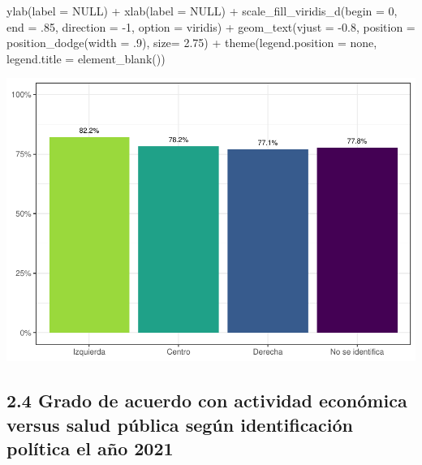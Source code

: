 \documentclass[
  12pt,
]{book}
\newenvironment{Shaded}{\begin{snugshade}}{\end{snugshade}}
\newcommand{\AttributeTok}[1]{\textcolor[rgb]{0.77,0.63,0.00}{#1}}
\newcommand{\ConstantTok}[1]{\textcolor[rgb]{0.00,0.00,0.00}{#1}}
\newcommand{\DecValTok}[1]{\textcolor[rgb]{0.00,0.00,0.81}{#1}}
\newcommand{\FloatTok}[1]{\textcolor[rgb]{0.00,0.00,0.81}{#1}}
\newcommand{\FunctionTok}[1]{\textcolor[rgb]{0.00,0.00,0.00}{#1}}
\newcommand{\NormalTok}[1]{#1}
\newcommand{\SpecialCharTok}[1]{\textcolor[rgb]{0.00,0.00,0.00}{#1}}
\newcommand{\StringTok}[1]{\textcolor[rgb]{0.31,0.60,0.02}{#1}}
\begin{document}
\begin{Shaded}
\begin{Highlighting}[]
    \FunctionTok{ylab}\NormalTok{(}\AttributeTok{label =} \ConstantTok{NULL}\NormalTok{) }\SpecialCharTok{+}
    \FunctionTok{xlab}\NormalTok{(}\AttributeTok{label =} \ConstantTok{NULL}\NormalTok{) }\SpecialCharTok{+}
    \FunctionTok{scale\_fill\_viridis\_d}\NormalTok{(}\AttributeTok{begin =} \DecValTok{0}\NormalTok{, }\AttributeTok{end =}\NormalTok{ .}\DecValTok{85}\NormalTok{, }\AttributeTok{direction =} \SpecialCharTok{{-}}\DecValTok{1}\NormalTok{, }\AttributeTok{option =} \StringTok{\textquotesingle{}viridis\textquotesingle{}}\NormalTok{) }\SpecialCharTok{+}
    \FunctionTok{geom\_text}\NormalTok{(}\AttributeTok{vjust =} \SpecialCharTok{{-}}\FloatTok{0.8}\NormalTok{,}
              \AttributeTok{position =} \FunctionTok{position\_dodge}\NormalTok{(}\AttributeTok{width =}\NormalTok{ .}\DecValTok{9}\NormalTok{),}
              \AttributeTok{size=} \FloatTok{2.75}\NormalTok{) }\SpecialCharTok{+}
    \FunctionTok{theme}\NormalTok{(}\AttributeTok{legend.position =} \StringTok{\textquotesingle{}none\textquotesingle{}}\NormalTok{,   }
          \AttributeTok{legend.title =} \FunctionTok{element\_blank}\NormalTok{())}
\end{Highlighting}
\end{Shaded}

\includegraphics{reporte-elsoc_files/figure-latex/unnamed-chunk-18-1.pdf}

\hypertarget{grado-de-acuerdo-con-actividad-econuxf3mica-versus-salud-puxfablica-seguxfan-identificaciuxf3n-poluxedtica-el-auxf1o-2021}{%
\subsection{2.4 Grado de acuerdo con actividad económica versus salud pública según identificación política el año 2021}\label{grado-de-acuerdo-con-actividad-econuxf3mica-versus-salud-puxfablica-seguxfan-identificaciuxf3n-poluxedtica-el-auxf1o-2021}}
\end{document}
